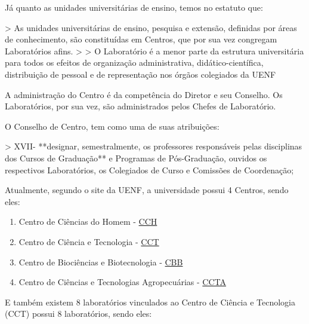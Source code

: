     Já quanto as unidades universitárias de ensino, temos no estatuto que:

    > As unidades universitárias de ensino, pesquisa e extensão, definidas por áreas de conhecimento, são constituídas em Centros, que por sua vez congregam Laboratórios afins.
    >
    > O Laboratório é a menor parte da estrutura universitária para todos os efeitos de organização administrativa, didático-científica, distribuição de pessoal e de representação nos órgãos colegiados da UENF

    A administração do Centro é da competência do Diretor e seu Conselho. Os Laboratórios, por sua vez, são administrados pelos Chefes de Laboratório.

    O Conselho de Centro, tem como uma de suas atribuições:

    > XVII- **designar, semestralmente, os professores responsáveis pelas disciplinas dos Cursos de Graduação** e Programas de Pós-Graduação, ouvidos os respectivos Laboratórios, os Colegiados de Curso e Comissões de Coordenação;

    Atualmente, segundo o site da UENF, a universidade possui 4 Centros, sendo eles:

    \begin{enumerate}
        \item Centro de Ciências do Homem - \href{https://uenf.br/}{CCH}
        \item Centro de Ciência e Tecnologia - \href{https://uenf.br/cct/}{CCT}
        \item Centro de Biociências e Biotecnologia - \href{https://uenf.br/}{CBB}
        \item Centro de Ciências e Tecnologias Agropecuárias - \href{https://uenf.br/}{CCTA}
    \end{enumerate}

    E também existem 8 laboratórios vinculados ao Centro de Ciência e Tecnologia (CCT) possui 8 laboratórios, sendo eles:

